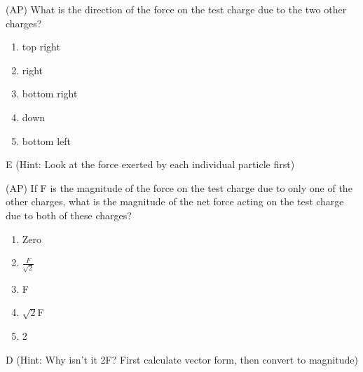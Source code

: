 
\begin{question}
(AP) What is the direction of the force on the test charge due to the two other charges?

\begin{enumerate}[label=(\alph*)]
    \item top right
    \item right
    \item bottom right
    \item down
    \item bottom left
\end{enumerate}

\end{question}

\begin{solution}
E (Hint: Look at the force exerted by each individual particle first)
\end{solution}


\begin{question}
(AP) If F is the magnitude of the force on the test charge due to only one of the other charges, what is the magnitude of the net force acting on the test charge due to both of these charges?
\begin{multicols}{5}
\begin{enumerate}[label=(\alph*)]
    \item Zero
    \item $\frac{F}{\sqrt{2}}$
    \item F
    \item $\sqrt{2}$F
    \item 2
\end{enumerate}
\end{multicols}

\end{question}

\begin{solution}
D (Hint: Why isn't it 2F? First calculate vector form, then convert to magnitude)
\end{solution}



